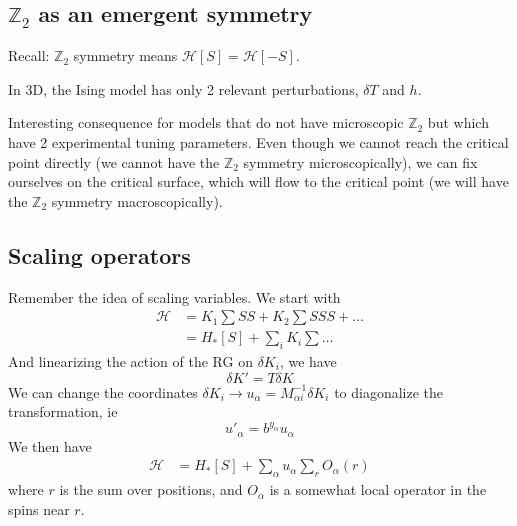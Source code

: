 \documentclass[a4paper]{book}
\theoremstyle{definition}
\theoremstyle{remark}
\begin{document}
\subsection{$\mathbb{Z}_2$ as an emergent symmetry}

Recall: $\mathbb{Z}_2$ symmetry means $\mathcal{H}[S] = \mathcal{H}[-S]$. \par \medskip 

In 3D, the Ising model has only 2 relevant perturbations, $\delta T$ and $h$. \par \medskip 

Interesting consequence for models that do not have microscopic $\mathbb{Z}_2$ but which have 2 experimental tuning parameters. Even though we cannot reach the critical point directly (we cannot have the $\mathbb{Z}_2$ symmetry microscopically), we can fix ourselves on the critical surface, which will flow to the critical point (we will have the $\mathbb{Z}_2$ symmetry macroscopically). 

\subsection{Scaling operators}

Remember the idea of scaling variables. We start with 
\begin{equation}
    \begin{aligned}
        \mathcal{H} &= K_1 \sum SS + K_2 \sum SSS + \dots \\
        &= H_*[S] + \sum_i K_i \sum \dots
    \end{aligned}
\end{equation}
And linearizing the action of the RG on $\delta K_i$, we have 
\begin{equation}
    \delta K' = T\delta K
\end{equation}
We can change the coordinates $\delta K_i \rightarrow u_\alpha = M^{-1}_{\alpha i}\delta K_i$ to diagonalize the transformation, ie 
\begin{equation}
    u'_\alpha = b^{y_\alpha}u_\alpha
\end{equation}
We then have 
\begin{equation}
    \begin{aligned}
        \mathcal{H} &= H_*[S] + \sum_\alpha u_\alpha \sum_r O_\alpha (r)
    \end{aligned}
\end{equation}
where $r$ is the sum over positions, and $O_\alpha$ is a somewhat local operator in the spins near $r$. \par \medskip 
\end{document}
